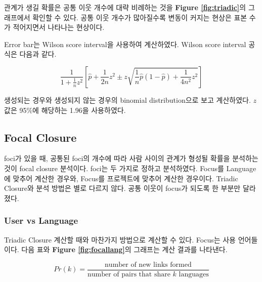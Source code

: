 \documentclass[10pt, a4paper, titlepage]{article}
\begin{document}
관계가 생길 확률은 공통 이웃 개수에 대략 비례하는 것을 {\bf Figure \ref{fig:triadic}}의 그래프에서 확인할 수 있다. 공통 이웃 개수가 많아질수록 변동이 커지는 현상은 표본 수가 적어지면서 나타나는 현상이다.

Error bar는 Wilson score interval을 사용하여 계산하였다. Wilson score interval 공식은 다음과 같다\cite{r10}.

$$
\frac{1}{1 + \frac{1}{n}z^2} \left[ 
\hat{p} + \frac{1}{2n} z^2 \pm z 
\sqrt{\frac{1}{n} \hat{p} (1- \hat{p}) + \frac{1}{4n^2} z^2}
\right]
$$

생성되는 경우와 생성되지 않는 경우의 binomial distribution으로 보고 계산하였다. $z$ 값은 95\%에 해당하는 1.96을 사용하였다.


\subsection{Focal Closure}

foci가 있을 때, 공통된 foci의 개수에 따라 사람 사이의 관계가 형성될 확률을 분석하는 것이 focal closure 분석이다. foci는 두 가지로 정하고 분석하였다. Focus를 Language에 맞추어 계산한 경우와, Focus를 프로젝트에 맞추어 계산한 경우이다. Triadic Closure와 분석 방법은 별로 다르지 않다. 공통 이웃이 focus가 되도록 한 부분만 달라졌다.

\subsubsection{User vs Language}

Triadic Closure 계산할 때와 마찬가지 방법으로 계산할 수 있다. Focus는 사용 언어들이다. 다음 표와 
{\bf Figure \ref{fig:focallang}}의 
그래프는 계산 결과를 나타낸다.

$$
Pr(k) = \frac{\textrm{number of new links formed}}{\textrm{number of pairs that share } k \textrm{ languages}}
$$
\end{document}
